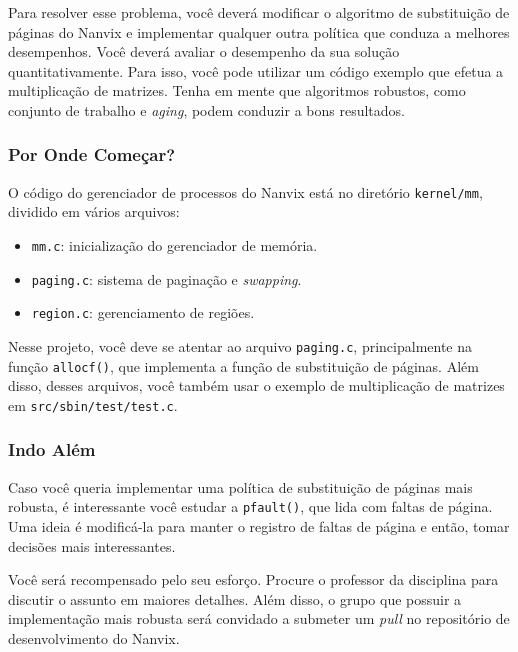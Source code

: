 \documentclass[11pt]{article}
\begin{document}
Para resolver esse problema, você deverá modificar o algoritmo de substituição de páginas do Nanvix e implementar qualquer outra política que conduza a melhores desempenhos. Você deverá avaliar o desempenho da sua solução quantitativamente. Para isso, você pode utilizar um código exemplo que efetua a multiplicação de matrizes. Tenha em mente que algoritmos robustos, como conjunto de trabalho e \textit{aging}, podem conduzir a bons resultados.

\subsubsection*{Por Onde Começar?}

O código do gerenciador de processos do Nanvix está no diretório \texttt{kernel/mm}, dividido em vários arquivos:

\begin{itemize}
    \item \texttt{mm.c}: inicialização do gerenciador de memória.
    \item \texttt{paging.c}: sistema de paginação e \textit{swapping}.
    \item \texttt{region.c}: gerenciamento de regiões.
\end{itemize}

Nesse projeto, você deve se atentar ao arquivo \texttt{paging.c}, principalmente na função \texttt{allocf()}, que implementa a função de substituição de páginas. Além disso, desses arquivos, você também usar o exemplo de multiplicação de matrizes em \texttt{src/sbin/test/test.c}.
\subsubsection*{Indo Além}

Caso você queria implementar uma política de substituição de páginas mais robusta, é interessante você estudar a \texttt{pfault()}, que lida com faltas de página. Uma ideia é modificá-la para manter o registro de faltas de página e então, tomar decisões mais interessantes.

Você será recompensado pelo seu esforço. Procure o professor da disciplina para discutir o assunto em maiores detalhes. Além disso, o grupo que possuir a implementação mais robusta será convidado a submeter um \textit{pull} no repositório de desenvolvimento do Nanvix.
\end{document}
